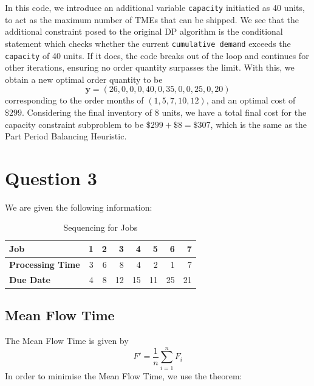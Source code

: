 \documentclass[12pt]{article}
\begin{document}
\noindent In this code, we introduce an additional variable \texttt{capacity} initiatied as 40 units, to act as the maximum number of TMEs that can be shipped. We see that the additional constraint posed to the original DP algorithm is the conditional statement which checks whether the current \texttt{cumulative demand} exceeds the \texttt{capacity} of 40 units. If it does, the code breaks out of the loop and continues for other iterations, ensuring no order quantity surpasses the limit. With this, we obtain a new optimal order quantity to be \begin{equation*}
    \mathbf{y} = (26, 0, 0, 0, 40, 0, 35, 0, 0, 25, 0, 20)
\end{equation*} corresponding to the order months of $(1, 5, 7, 10, 12)$, and an optimal cost of $\$299$. Considering the final inventory of 8 units, we have a total final cost for the capacity constraint subproblem to be $\$299 + \$8 = \$307$, which is the same as the Part Period Balancing Heuristic. 

\newpage

\section*{Question 3}

We are given the following information: \begin{table}[H]
    \centering
    \begin{tabular}{l r r r r r r r }\toprule 
        \textbf{Job} & 1 & 2 & 3 & 4 & 5 & 6 & 7 \\ \midrule 
        \textbf{Processing Time} & 3 & 6 & 8 & 4 & 2 & 1 & 7 \\ 
        \textbf{Due Date} & 4 & 8 & 12 & 15 & 11 & 25 & 21 \\ \bottomrule
    \end{tabular}
    \caption{Sequencing for Jobs}
    \label{tab:3-seq}
\end{table}

\subsection*{Mean Flow Time}

The Mean Flow Time is given by \begin{equation}
    F' = \frac{1}{n} \sum_{i=1}^{n} F_i
\end{equation} In order to minimise the Mean Flow Time, we use the theorem: \\ 
\end{document}
